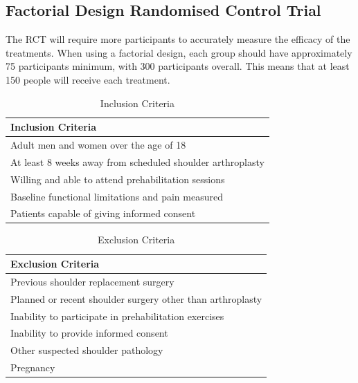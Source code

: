 \documentclass[conference]{IEEEtran}
\begin{document}
\subsection{Factorial Design Randomised Control Trial}

The RCT will require more participants to accurately measure the efficacy of the treatments.  When using a factorial design, each group should have approximately 75 participants minimum, with 300 participants overall. This means that at least 150 people will receive each treatment.

\begin{table}[h!]
\centering
\caption{Inclusion Criteria}
\begin{tabular}{|p{8cm}|}
\hline
\textbf{Inclusion Criteria} \\
\hline
Adult men and women over the age of 18 \\
\hline
At least 8 weeks away from scheduled shoulder arthroplasty \\
\hline
Willing and able to attend prehabilitation sessions \\
\hline
Baseline functional limitations and pain measured \\
\hline
Patients capable of giving informed consent\\
\hline
\end{tabular}
\label{tab:inclusion}
\end{table}

\begin{table}[h!]
\centering
\caption{Exclusion Criteria}
\begin{tabular}{|p{8cm}|}
\hline
\textbf{Exclusion Criteria} \\
\hline
Previous shoulder replacement surgery \\
\hline
Planned or recent shoulder surgery other than arthroplasty \\
\hline
Inability to participate in prehabilitation exercises \\
\hline
Inability to provide informed consent\\
\hline
Other suspected shoulder pathology\\
\hline
Pregnancy\\
\hline
\end{tabular}
\label{tab:exclusion}
\end{table}
\end{document}
